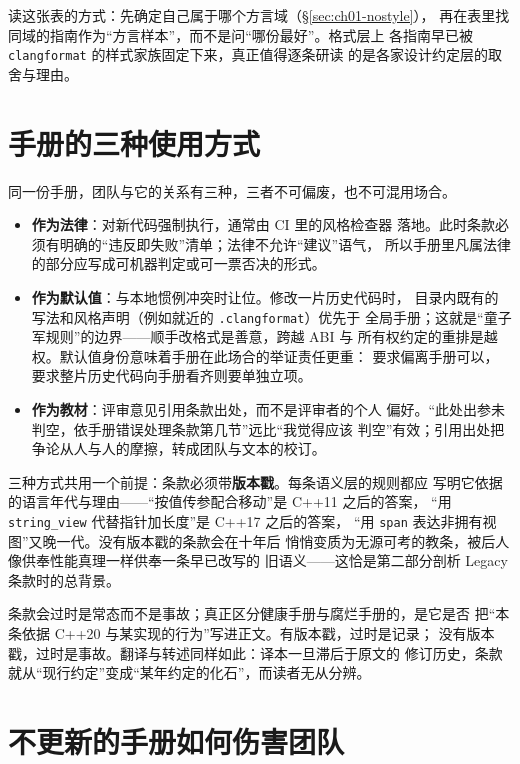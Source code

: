 \documentclass[12pt,a4paper,fontset=fandol]{ctexbook}
\newcommand{\cpp}[1]{C++#1}
\newcommand{\Tp}[1]{\texttt{#1}}
\newcommand{\Bk}{\discretionary{}{}{}}
\newcommand{\Lang}[1]{\textsf{#1}}
\newcommand{\DomTra}{\Lang{Legacy}}
\begin{document}
读这张表的方式：先确定自己属于哪个方言域（\S\ref{sec:ch01-nostyle}），
再在表里找同域的指南作为``方言样本''，而不是问``哪份最好''。格式层上
各指南早已被 \Tp{clang{\Bk}format} 的样式家族固定下来，真正值得逐条研读
的是各家设计约定层的取舍与理由。

\section{手册的三种使用方式}
\label{sec:ch01-usage}

同一份手册，团队与它的关系有三种，三者不可偏废，也不可混用场合。

\begin{itemize}
\item \textbf{作为法律}：对新代码强制执行，通常由 CI 里的风格检查器
落地。此时条款必须有明确的``违反即失败''清单；法律不允许``建议''语气，
所以手册里凡属法律的部分应写成可机器判定或可一票否决的形式。
\item \textbf{作为默认值}：与本地惯例冲突时让位。修改一片历史代码时，
目录内既有的写法和风格声明（例如就近的 \Tp{.clang{\Bk}format}）优先于
全局手册；这就是``童子军规则''的边界——顺手改格式是善意，跨越 ABI 与
所有权约定的重排是越权。默认值身份意味着手册在此场合的举证责任更重：
要求偏离手册可以，要求整片历史代码向手册看齐则要单独立项。
\item \textbf{作为教材}：评审意见引用条款出处，而不是评审者的个人
偏好。``此处出参未判空，依手册错误处理条款第几节''远比``我觉得应该
判空''有效；引用出处把争论从人与人的摩擦，转成团队与文本的校订。
\end{itemize}

三种方式共用一个前提：条款必须带\textbf{版本戳}。每条语义层的规则都应
写明它依据的语言年代与理由——``按值传参配合移动''是 \cpp{11} 之后的答案，
``用 \Tp{string\_view} 代替指针加长度''是 \cpp{17} 之后的答案，
``用 \Tp{span} 表达非拥有视图''又晚一代。没有版本戳的条款会在十年后
悄悄变质为无源可考的教条，被后人像供奉性能真理一样供奉一条早已改写的
旧语义——这恰是第二部分剖析 \DomTra{} 条款时的总背景。

\begin{note}[title={为什么版本戳比条款本身更重要}]
条款会过时是常态而不是事故；真正区分健康手册与腐烂手册的，是它是否
把``本条依据 \cpp{20} 与某实现的行为''写进正文。有版本戳，过时是记录；
没有版本戳，过时是事故。翻译与转述同样如此：译本一旦滞后于原文的
修订历史，条款就从``现行约定''变成``某年约定的化石''，而读者无从分辨。
\end{note}

\section{不更新的手册如何伤害团队}
\label{sec:ch01-stale}
\end{document}
